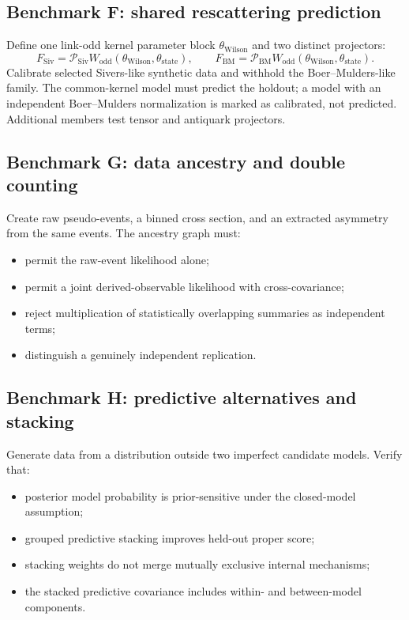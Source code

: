 \documentclass[11pt]{article}
\newcommand{\cP}{\mathcal P}
\newcommand{\wil}{\mathrm{Wilson}}
\begin{document}
\subsection{Benchmark F: shared rescattering prediction}

Define one link-odd kernel parameter block \(\theta_{\wil}\) and two distinct
projectors:
\begin{equation}
 F_{\mathrm{Siv}}
 =
 \cP_{\mathrm{Siv}}
 W_{\mathrm{odd}}(\theta_{\wil},\theta_{\mathrm{state}}),
 \qquad
 F_{\mathrm{BM}}
 =
 \cP_{\mathrm{BM}}
 W_{\mathrm{odd}}(\theta_{\wil},\theta_{\mathrm{state}}).
 \label{eq:benchmark-f}
\end{equation}
Calibrate selected Sivers-like synthetic data and withhold the Boer--Mulders-like
family.  The common-kernel model must predict the holdout; a model with an
independent Boer--Mulders normalization is marked as calibrated, not
predicted.  Additional members test tensor and antiquark projectors.

\subsection{Benchmark G: data ancestry and double counting}

Create raw pseudo-events, a binned cross section, and an extracted asymmetry
from the same events.  The ancestry graph must:
\begin{itemize}
\item permit the raw-event likelihood alone;
\item permit a joint derived-observable likelihood with cross-covariance;
\item reject multiplication of statistically overlapping summaries as
independent terms;
\item distinguish a genuinely independent replication.
\end{itemize}

\subsection{Benchmark H: predictive alternatives and stacking}

Generate data from a distribution outside two imperfect candidate models.
Verify that:
\begin{itemize}
\item posterior model probability is prior-sensitive under the closed-model
assumption;
\item grouped predictive stacking improves held-out proper score;
\item stacking weights do not merge mutually exclusive internal mechanisms;
\item the stacked predictive covariance includes within- and between-model
components.
\end{itemize}
\end{document}
